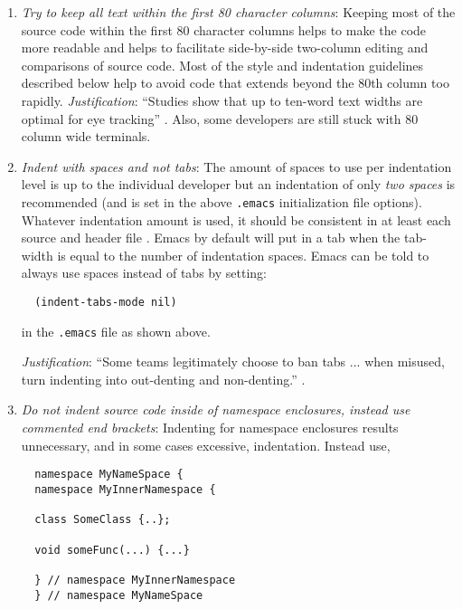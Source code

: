 \begin{enumerate}

{}\item\textit{Try to keep all text within the first 80 character columns}:
Keeping most of the source code within the first 80 character columns helps to
make the code more readable and helps to facilitate side-by-side two-column
editing and comparisons of source code.  Most of the style and indentation
guidelines described below help to avoid code that extends beyond the 80th
column too rapidly. {}\textit{Justification}: ``Studies show that up to
ten-word text widths are optimal for eye tracking'' {}\cite[Item
0]{C++CodingStandards05}.  Also, some developers are still stuck with 80
column wide terminals.

{}\item\textit{Indent with spaces and not tabs}: The amount of spaces to use
per indentation level is up to the individual developer but an indentation of
only {}\textit{two spaces} is recommended (and is set in the above
{}\texttt{.emacs} initialization file options).  Whatever indentation amount
is used, it should be consistent in at least each source and header file
{}\cite[Item 0]{C++CodingStandards05}.  Emacs by default will put in a tab
when the tab-width is equal to the number of indentation spaces.  Emacs can be
told to always use spaces instead of tabs by setting:

{\small\begin{verbatim}
  (indent-tabs-mode nil)
\end{verbatim}}

in the {}\texttt{.emacs} file as shown above.

{}\textit{Justification}: ``Some teams legitimately choose to ban tabs
... when misused, turn indenting into out-denting and non-denting.''
{}\cite{C++CodingStandards05}.

{}\item\textit{Do not indent source code inside of namespace enclosures,
instead use commented end brackets}: Indenting for namespace enclosures
results unnecessary, and in some cases excessive, indentation.  Instead use,

{\small\begin{verbatim}
  namespace MyNameSpace {
  namespace MyInnerNamespace {

  class SomeClass {..};

  void someFunc(...) {...}

  } // namespace MyInnerNamespace
  } // namespace MyNameSpace
\end{verbatim}}


\end{enumerate}
